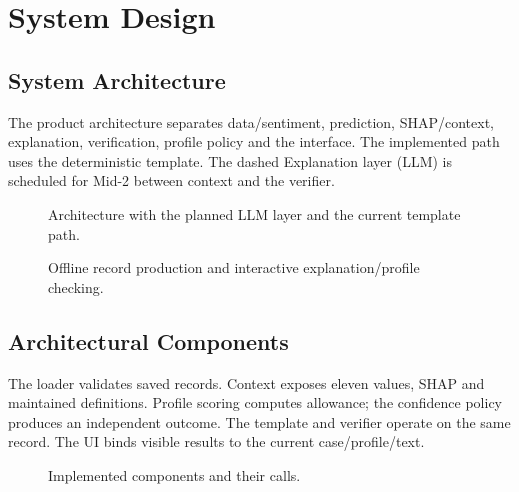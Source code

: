 \chapter{System Design}
\label{chap:design}
\section{System Architecture}
The product architecture separates data/sentiment, prediction, SHAP/context, explanation, verification, profile policy and the interface. The implemented path uses the deterministic template. The dashed Explanation layer (LLM) is scheduled for Mid-2 between context and the verifier.
\begin{figure}[htbp]\centering\caption{Architecture with the planned LLM layer and the current template path.}\label{fig:planned-architecture}\end{figure}
\begin{figure}[htbp]\centering\caption{Offline record production and interactive explanation/profile checking.}\label{fig:pipeline}\end{figure}
\section{Architectural Components}
The loader validates saved records. Context exposes eleven values, SHAP and maintained definitions. Profile scoring computes allowance; the confidence policy produces an independent outcome. The template and verifier operate on the same record. The UI binds visible results to the current case/profile/text.
\begin{figure}[htbp]\centering\caption{Implemented components and their calls.}\label{fig:components}\end{figure}
